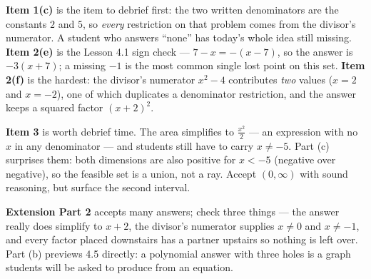 \documentclass[10pt]{article}
\begin{document}
\clearpage %
\begin{teachernote}
\textbf{Item 1(c)} is the item to debrief first: the two written denominators are the constants $2$ and
$5$, so \emph{every} restriction on that problem comes from the divisor's numerator. A student who
answers ``none'' has today's whole idea still missing.
\textbf{Item 2(e)} is the Lesson 4.1 sign check --- $7-x=-(x-7)$, so the answer is $-3(x+7)$; a missing
$-1$ is the most common single lost point on this set. \textbf{Item 2(f)} is the hardest: the divisor's
numerator $x^2-4$ contributes \emph{two} values ($x=2$ and $x=-2$), one of which duplicates a
denominator restriction, and the answer keeps a squared factor $(x+2)^2$.

\vspace{3pt}
\textbf{Item 3} is worth debrief time. The area simplifies to $\frac{x^2}{2}$ --- an expression with no
$x$ in any denominator --- and students still have to carry $x\neq-5$. Part (c) surprises them: both
dimensions are also positive for $x<-5$ (negative over negative), so the feasible set is a union, not a
ray. Accept $(0,\infty)$ with sound reasoning, but surface the second interval.

\vspace{3pt}
\textbf{Extension Part 2} accepts many answers; check three things --- the answer really does simplify
to $x+2$, the divisor's numerator supplies $x\neq0$ and $x\neq-1$, and every factor placed downstairs
has a partner upstairs so nothing is left over. Part (b) previews 4.5 directly: a polynomial answer
with three holes is a graph students will be asked to produce from an equation.
\end{teachernote}
\end{document}
